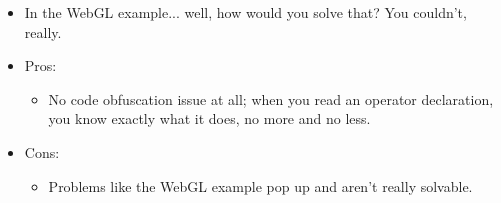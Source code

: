 \documentclass{article}
\begin{document}
\begin{enumerate}
\begin{itemize}
		\item In the WebGL example... well, how would you solve that? You couldn't, really.
		\item Pros:
		\begin{itemize}
			\item No code obfuscation issue at all; when you read an operator declaration, you know exactly what it does, no more and no less.
		\end{itemize}
		\item Cons:
		\begin{itemize}
			\item Problems like the WebGL example pop up and aren't really solvable.
		\end{itemize}
	\end{itemize}
\end{enumerate}
\end{document}
